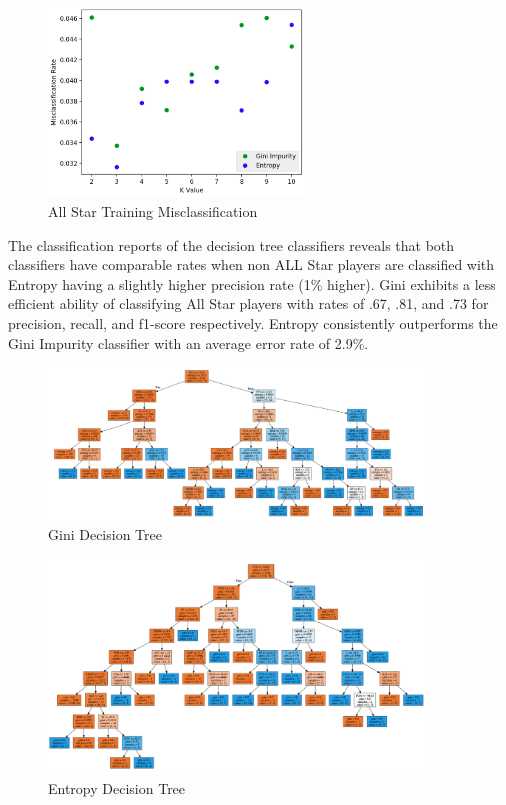 \documentclass{article}
\begin{document}
\begin{figure}
  \centering
  \includegraphics[width=6.8cm]{decision_training_error.png}
  \caption{All Star Training Misclassification}
\end{figure}

The classification reports of the decision tree classifiers reveals that both classifiers have comparable rates when non ALL Star players are classified with Entropy having a slightly higher precision rate (1\% higher). Gini exhibits a less efficient ability of classifying All Star players with rates of .67, .81, and .73 for precision, recall, and f1-score respectively.  Entropy consistently outperforms the Gini Impurity classifier with an average error rate of 2.9\%.


\begin{figure}
  \centering
  \includegraphics[width=10cm]{gini_decission.png}
  \caption{Gini Decision Tree}
\end{figure}

\begin{figure}
  \centering
  \includegraphics[width=10cm]{entropy_decision.png}
  \caption{Entropy Decision Tree}
\end{figure}
\end{document}
